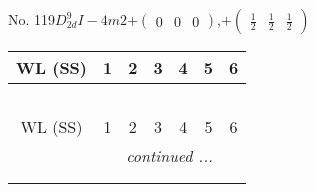 \documentclass[fleqn,9pt,landscape]{jsarticle}
\begin{document}
\newpage
No. 119\quad$D_{2d}^{9}$\quad$I-4m2$\quad[ tetragonal ]\quad$+\begin{pmatrix} 0 & 0 & 0 \end{pmatrix}$,\quad $+\begin{pmatrix} \frac{1}{2} & \frac{1}{2} & \frac{1}{2} \end{pmatrix}$
\begin{center}
\renewcommand{\arraystretch}{1.2}
\begin{longtable}{ccccccc}
 \hline \hline
WL (SS) & 1 & 2 & 3 & 4 & 5 & 6 \\ \hline \endfirsthead

\multicolumn{6}{l}{\tablename\ \thetable{}} \\
 \hline \hline
WL (SS) & 1 & 2 & 3 & 4 & 5 & 6 \\ \hline \endhead

 \hline \hline
\multicolumn{6}{r}{\footnotesize\it continued ...} \\ \endfoot

 \hline \hline
\multicolumn{6}{r}{} \\ \endlastfoot


\end{longtable}
\end{center}
\end{document}
